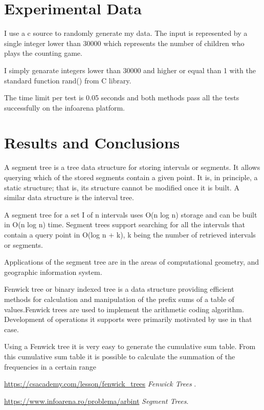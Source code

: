\documentclass{article}
\begin{document}
\section{Experimental Data}

I use a c source to randomly generate my data. The input is represented by a single integer lower than 30000 which represents the number of children who plays the counting game. 

I simply genarate integers lower than 30000 and higher or equal than 1 with the standard function rand() from C library.

The time limit per test is 0.05 seconds and both methods pass all the tests successfully on the infoarena platform. 

\section{Results and Conclusions}

A segment tree is a tree data structure for storing intervals or segments. It allows querying which of the stored segments contain a given point. It is, in principle, a static structure; that is, its structure cannot be modified once it is built. A similar data structure is the interval tree.

A segment tree for a set I of n intervals uses O(n log n) storage and can be built in O(n log n) time. Segment trees support searching for all the intervals that contain a query point in O(log n + k), k being the number of retrieved intervals or segments.

Applications of the segment tree are in the areas of computational geometry, and geographic information system.

Fenwick tree or binary indexed tree is a data structure providing efficient methods for calculation and manipulation of the prefix sums of a table of values.Fenwick trees are used to implement the arithmetic coding algorithm. Development of operations it supports were primarily motivated by use in that case.

Using a Fenwick tree it is very easy to generate the cumulative sum table. From this cumulative sum table it is possible to calculate the summation of the frequencies in a certain range


\begin{thebibliography}{9}
\label{sec_ref}

	\url{https://csacademy.com/lesson/fenwick_trees}
	  \emph{ Fenwick Trees }.
	  

	\url{https://www.infoarena.ro/problema/arbint}
	  \emph{Segment Trees}.

\end{thebibliography}
\end{document}
